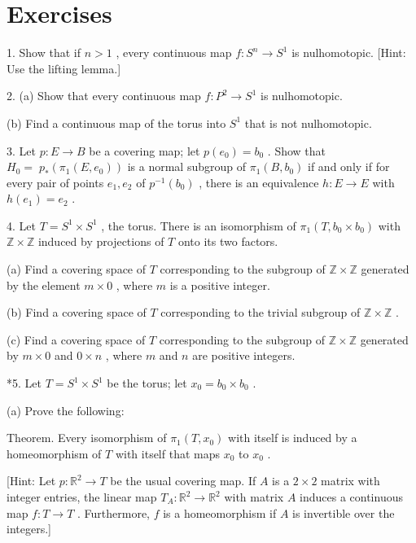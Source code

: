 \documentclass[10pt]{article}
\begin{document}
\section*{Exercises}

1. Show that if \(n > 1\) , every continuous map \(f : {S}^{n} \rightarrow  {S}^{1}\) is nulhomotopic. [Hint: Use the lifting lemma.]

2. (a) Show that every continuous map \(f : {P}^{2} \rightarrow  {S}^{1}\) is nulhomotopic.

(b) Find a continuous map of the torus into \({S}^{1}\) that is not nulhomotopic.

3. Let \(p : E \rightarrow  B\) be a covering map; let \(p\left( {e}_{0}\right)  = {b}_{0}\) . Show that \({H}_{0} = \; {p}_{ * }\left( {{\pi }_{1}\left( {E,{e}_{0}}\right) }\right)\) is a normal subgroup of \({\pi }_{1}\left( {B,{b}_{0}}\right)\) if and only if for every pair of points \({e}_{1},{e}_{2}\) of \({p}^{-1}\left( {b}_{0}\right)\) , there is an equivalence \(h : E \rightarrow  E\) with \(h\left( {e}_{1}\right)  = {e}_{2}\) .

4. Let \(T = {S}^{1} \times  {S}^{1}\) , the torus. There is an isomorphism of \({\pi }_{1}\left( {T,{b}_{0} \times  {b}_{0}}\right)\) with \(\mathbb{Z} \times  \mathbb{Z}\) induced by projections of \(T\) onto its two factors.

(a) Find a covering space of \(T\) corresponding to the subgroup of \(\mathbb{Z} \times  \mathbb{Z}\) generated by the element \(m \times  0\) , where \(m\) is a positive integer.

(b) Find a covering space of \(T\) corresponding to the trivial subgroup of \(\mathbb{Z} \times  \mathbb{Z}\) .

(c) Find a covering space of \(T\) corresponding to the subgroup of \(\mathbb{Z} \times  \mathbb{Z}\) generated by \(m \times  0\) and \(0 \times  n\) , where \(m\) and \(n\) are positive integers.

*5. Let \(T = {S}^{1} \times  {S}^{1}\) be the torus; let \({x}_{0} = {b}_{0} \times  {b}_{0}\) .

(a) Prove the following:

Theorem. Every isomorphism of \({\pi }_{1}\left( {T,{x}_{0}}\right)\) with itself is induced by a homeomorphism of \(T\) with itself that maps \({x}_{0}\) to \({x}_{0}\) .

[Hint: Let \(p : {\mathbb{R}}^{2} \rightarrow  T\) be the usual covering map. If \(A\) is a \(2 \times  2\) matrix with integer entries, the linear map \({T}_{A} : {\mathbb{R}}^{2} \rightarrow  {\mathbb{R}}^{2}\) with matrix \(A\) induces a continuous map \(f : T \rightarrow  T\) . Furthermore, \(f\) is a homeomorphism if \(A\) is invertible over the integers.]
\end{document}
